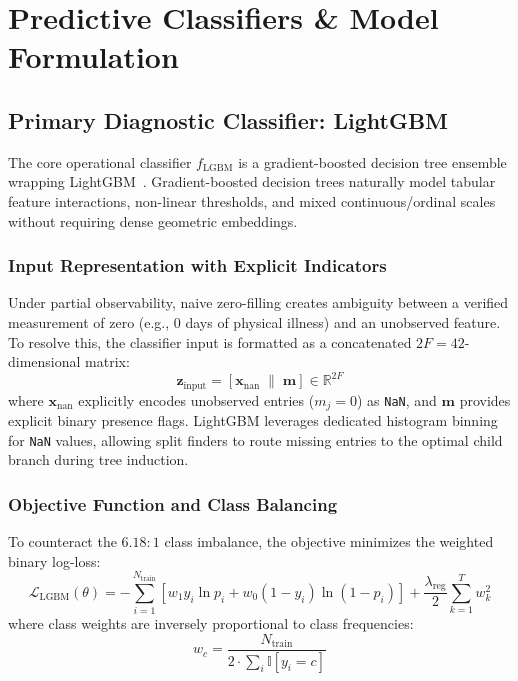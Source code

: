 \documentclass[11pt,a4paper]{report}
\begin{document}
\chapter{Predictive Classifiers \& Model Formulation}

\section{Primary Diagnostic Classifier: LightGBM}
The core operational classifier $f_{\text{LGBM}}$ is a gradient-boosted decision tree ensemble wrapping LightGBM~\cite{ke2017lightgbm}. Gradient-boosted decision trees naturally model tabular feature interactions, non-linear thresholds, and mixed continuous/ordinal scales without requiring dense geometric embeddings.

\subsection{Input Representation with Explicit Indicators}
Under partial observability, naive zero-filling creates ambiguity between a verified measurement of zero (e.g., $0$ days of physical illness) and an unobserved feature. To resolve this, the classifier input is formatted as a concatenated $2F = 42$-dimensional matrix:
\begin{equation}
  \mathbf{z}_{\text{input}} = [\mathbf{x}_{\text{nan}} \;\parallel\; \mathbf{m}] \in \mathbb{R}^{2F}
\end{equation}
where $\mathbf{x}_{\text{nan}}$ explicitly encodes unobserved entries ($m_j = 0$) as \texttt{NaN}, and $\mathbf{m}$ provides explicit binary presence flags. LightGBM leverages dedicated histogram binning for \texttt{NaN} values, allowing split finders to route missing entries to the optimal child branch during tree induction.

\subsection{Objective Function and Class Balancing}
To counteract the $6.18:1$ class imbalance, the objective minimizes the weighted binary log-loss:
\begin{equation}
  \mathcal{L}_{\text{LGBM}}(\theta) = -\sum_{i=1}^{N_{\text{train}}} \left[ w_1 y_i \ln p_i + w_0 (1 - y_i) \ln (1 - p_i) \right] + \frac{\lambda_{\text{reg}}}{2} \sum_{k=1}^T w_k^2
\end{equation}
where class weights are inversely proportional to class frequencies:
\begin{equation}
  w_c = \frac{N_{\text{train}}}{2 \cdot \sum_{i} \mathbb{I}[y_i = c]}
\end{equation}
\end{document}
